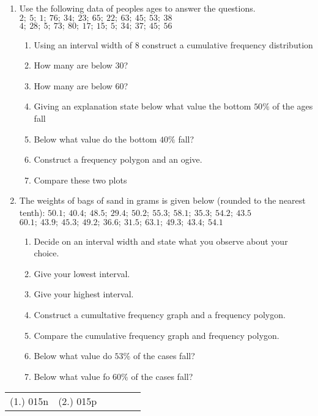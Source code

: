 {
\begin{enumerate}
\item Use the following data of peoples ages to answer the questions. \newline
$2;~ 5;~1;~ 76;~ 34;~ 23; ~65; ~22;~ 63;~ 45;~ 53; ~38 $\newline
$4; ~28; ~5; ~73; ~80; ~17; ~15; ~5; ~34; ~37;~ 45; ~56 $
	\begin{enumerate}
	\item Using an interval width of $8$ construct a cumulative frequency distribution 
	\item How many are below $30$?
	\item How many are below $60$?
	\item Giving an explanation state below what value the bottom $50\%$ of the ages fall
	\item Below what value do the bottom $40\%$ fall?
	\item Construct a frequency polygon and an ogive. 
	\item Compare these two plots
	\end{enumerate}
\item The weights of bags of sand in grams is given below (rounded to the nearest tenth): \newline
$50.1;~ 40.4; ~48.5;~ 29.4; ~50.2; ~55.3;~ 58.1;~ 35.3;~ 54.2;~ 43.5$ \newline
$60.1; ~43.9;~ 45.3; ~49.2; ~36.6; ~31.5; ~63.1; ~49.3;~ 43.4; ~54.1$ 
	\begin{enumerate}
	\item Decide on an interval width and state what you observe about your choice.
	\item Give your lowest interval. 
	\item Give your highest interval.
	\item Construct a cumultative frequency graph and a frequency polygon.
	\item Compare the cumulative frequency graph and frequency polygon.
	\item Below what value do $53\%$ of the cases fall?
	\item Below what value fo $60\%$ of the cases fall?
	\end{enumerate}
\end{enumerate}


\par \practiceinfo
\par \begin{tabular}[h]{cccccc}
(1.)	015n	&
(2.)	015p	&
\end{tabular}}


